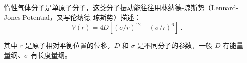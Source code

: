 
惰性气体分子是单原子分子，这类分子振动能往往用林纳德-琼斯势（Lennard-Jones Potential，又写伦纳德-琼斯势）描述：
\begin{equation}
V(r) = 4 D\left[(\sigma / r)^{12} - (\sigma/r)^6\right] ~.
\end{equation}

其中 $r$ 是原子相对平衡位置的位移，$D$ 和 $\sigma$ 是不同分子的参数，一般 $D$ 有能量量纲、$\sigma$ 有长度量纲。
